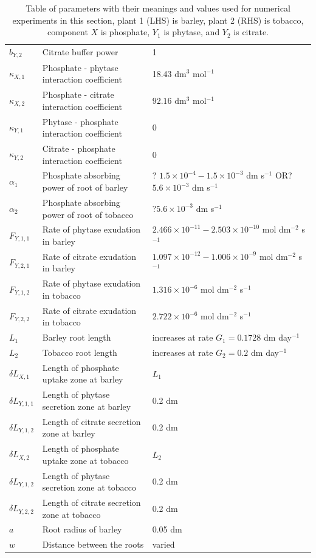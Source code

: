 \documentclass[11pt]{article}
\numberwithin{equation}{section}
\begin{document}
\begin{table}[!htb]
\begin{center}
\begin{tabular}{lll}
	$b_{Y,2}$ & Citrate buffer power & 1 \\
	$\kappa_{X,1}$ & Phosphate - phytase interaction coefficient & 18.43 dm$^3$ mol$^{-1}$ \\
	$\kappa_{X,2}$ & Phosphate - citrate interaction coefficient & $92.16$ dm$^3$ mol$^{-1}$ \\
	$\kappa_{Y,1}$ & Phytase - phosphate interaction coefficient & 0 \\
	$\kappa_{Y,2}$ & Citrate - phosphate interaction coefficient & 0 \\ 
	$\alpha_1 $ & Phosphate absorbing power of root of barley & ? $1.5 \times 10^{-4} - 1.5 \times 10^{-3} $ dm s$^{-1}$ OR? $5.6 \times 10^{-3}$ dm s$^{-1}$\\
	$\alpha_2 $ & Phosphate absorbing power of root of tobacco & ?$5.6 \times 10^{-3}$ dm s$^{-1}$\\
	$F_{Y,1,1} $ & Rate of phytase exudation in barley & $2.466 \times 10^{-11} - 2.503 \times 10^{-10}$  mol dm$^{-2}$ s$^{-1}$ \\
	$F_{Y,2,1} $ & Rate of citrate exudation in barley & $1.097 \times 10^{-12} - 1.006 \times 10^{-9}$ mol dm$^{-2}$ s$^{-1}$ \\
	$F_{Y,1,2} $ & Rate of phytase exudation in tobacco &  $1.316 \times 10^{-6}$ mol dm$^{-2}$ s$^{-1}$ \\
	$F_{Y,2,2} $ & Rate of citrate exudation in tobacco &  $2.722 \times 10^{-6}$ mol dm$^{-2}$ s$^{-1}$ \\
	$L_1$ & Barley root length & increases at rate $G_1 = 0.1728$ dm day$^{-1}$ \\
	$L_2$ & Tobacco root length & increases at rate $G_2 = 0.2$ dm day$^{-1}$\\
	$\delta L_{X,1}$ & Length of phosphate uptake zone at barley & $L_1$\\
	$\delta L_{Y,1,1}$ & Length of phytase secretion zone at barley & 0.2 dm \\
	$\delta L_{Y,1,2}$ & Length of citrate secretion zone at barley & 0.2 dm\\
	$\delta L_{X,2}$ & Length of phosphate uptake zone at tobacco & $L_2$ \\
	$\delta L_{Y,1,2}$ &  Length of phytase secretion zone at tobacco & 0.2 dm \\
	$\delta L_{Y,2,2}$ &  Length of citrate secretion zone at tobacco & 0.2 dm \\
	$a$ & Root radius of barley & 0.05 dm \\
	$w$ & Distance between the roots & varied \\
\bottomrule

\end{tabular}
\caption{Table of parameters with their meanings and values used for numerical experiments in this section, plant 1 (LHS) is barley, plant 2 (RHS) is tobacco, component $X$ is phosphate, $Y_1$ is phytase, and $Y_2$ is citrate. \label{t:Second-model-params}
}
\end{center}

\end{table}
\end{document}
